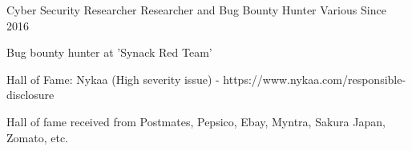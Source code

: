 \begin{cventries}
  \cventry
    {Cyber Security Researcher} %
    {Researcher and Bug Bounty Hunter} %
    {Various} %
    {Since 2016} %
    {
      \begin{cvitems} %
        \item {Bug bounty hunter at 'Synack Red Team'}
        \item {Hall of Fame: Nykaa (High severity issue) - https://www.nykaa.com/responsible-disclosure}
        \item {Hall of fame received from Postmates, Pepsico, Ebay, Myntra, Sakura Japan, Zomato, etc.}
      \end{cvitems}
    }

\end{cventries}
